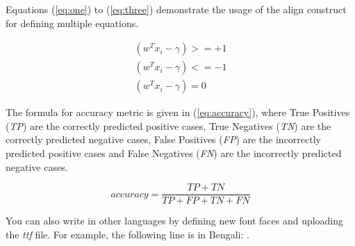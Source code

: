 Equations (\ref{eq:one}) to (\ref{eq:three}) demonstrate the usage of the align construct for defining multiple equations.

\begin{align}
    (w^T x_i-\gamma)>=+1    \label{eq:one} \\
    (w^T x_i-\gamma)<=-1    \label{eq:two} \\
    (w^T x_i-\gamma)=0      \label{eq:three}
\end{align}

The formula for accuracy metric is given in (\ref{eq:accuracy}), where True Positives (\textit{TP}) are the correctly predicted positive cases, True Negatives (\textit{TN}) are the correctly predicted negative cases, False Positives (\textit{FP}) are the incorrectly predicted positive cases and False Negatives (\textit{FN}) are the incorrectly predicted negative cases.

\begin{equation}
\label{eq:accuracy}
accuracy = \frac{TP + TN}{TP + FP + TN + FN}
\end{equation}

\bigskip
You can also write in other languages by defining new font faces and uploading the \textit{ttf} file. For example, the following line is in Bengali: {}.

